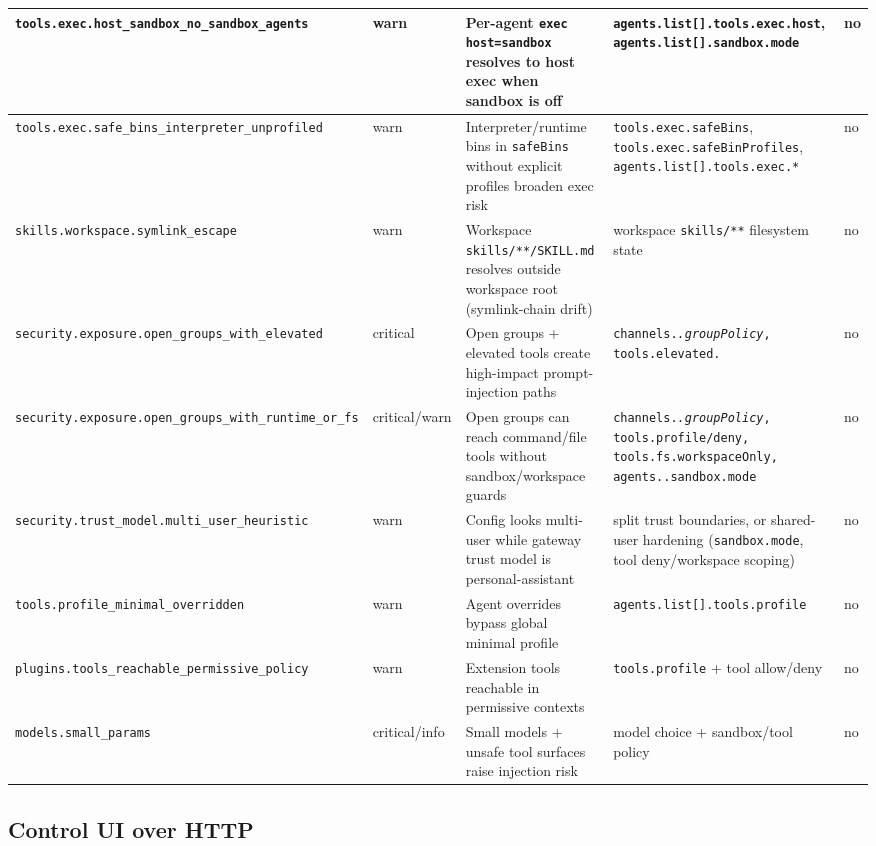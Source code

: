 \begin{table}[h]
\begin{tabular}{|l|l|l|l|l|}
\hline
\texttt{tools.exec.host\_sandbox\_no\_sandbox\_agents} & warn & Per-agent \texttt{exec host=sandbox} resolves to host exec when sandbox is off & \texttt{agents.list[].tools.exec.host}, \texttt{agents.list[].sandbox.mode} & no \\
\hline
\texttt{tools.exec.safe\_bins\_interpreter\_unprofiled} & warn & Interpreter/runtime bins in \texttt{safeBins} without explicit profiles broaden exec risk & \texttt{tools.exec.safeBins}, \texttt{tools.exec.safeBinProfiles}, \texttt{agents.list[].tools.exec.*} & no \\
\hline
\texttt{skills.workspace.symlink\_escape} & warn & Workspace \texttt{skills/**/SKILL.md} resolves outside workspace root (symlink-chain drift) & workspace \texttt{skills/**} filesystem state & no \\
\hline
\texttt{security.exposure.open\_groups\_with\_elevated} & critical & Open groups + elevated tools create high-impact prompt-injection paths & \texttt{channels.\textit{.groupPolicy}, \texttt{tools.elevated.}} & no \\
\hline
\texttt{security.exposure.open\_groups\_with\_runtime\_or\_fs} & critical/warn & Open groups can reach command/file tools without sandbox/workspace guards & \texttt{channels.\textit{.groupPolicy}, \texttt{tools.profile/deny}, \texttt{tools.fs.workspaceOnly}, \texttt{agents.}.sandbox.mode} & no \\
\hline
\texttt{security.trust\_model.multi\_user\_heuristic} & warn & Config looks multi-user while gateway trust model is personal-assistant & split trust boundaries, or shared-user hardening (\texttt{sandbox.mode}, tool deny/workspace scoping) & no \\
\hline
\texttt{tools.profile\_minimal\_overridden} & warn & Agent overrides bypass global minimal profile & \texttt{agents.list[].tools.profile} & no \\
\hline
\texttt{plugins.tools\_reachable\_permissive\_policy} & warn & Extension tools reachable in permissive contexts & \texttt{tools.profile} + tool allow/deny & no \\
\hline
\texttt{models.small\_params} & critical/info & Small models + unsafe tool surfaces raise injection risk & model choice + sandbox/tool policy & no \\
\hline
\end{tabular}
\end{table}



\subsection{Control UI over HTTP}



